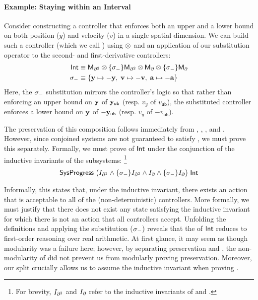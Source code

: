 \paragraph*{Example: Staying within an Interval}
Consider constructing a controller that enforces both an upper and a lower
bound on both position ($y$) and velocity ($v$) in a single spatial
dimension.  We can build such a controller (which we call \intervalShim)
using $\otimes$ and an application of our substitution operator to the
second- and first-derivative controllers:
\begin{align*}
{\ensuremath{\mathsf{Int}}} &\equiv {\ensuremath{\mathsf{M}_{\partial^2}}} \otimes \{\sigma_{-}\}{\mathsf{M}_{\partial^2}} \otimes {\ensuremath{\mathsf{M}_\partial}} \otimes \{\sigma_{-}\}{\mathsf{M}_\partial} \\
\sigma_{-} &\equiv \{ \mathbf{y} \mapsto -\mathbf{y} ,\; \mathbf{v} \mapsto -\mathbf{v} ,\; \mathbf{a} \mapsto -\mathbf{a} \}
\end{align*}
Here, the $\sigma_{-}$ substitution mirrors the controller's logic so that
rather than enforcing an upper bound on $\mathbf{y}$ of $\mathsf{\mathbf{y}_{ub}}$ (resp. $v_y$
of $v_{\mathsf{ub}}$), the substituted controller enforces a lower bound on
$\mathbf{y}$ of $-\mathsf{\mathbf{y}_{ub}}$ (resp. $v_y$ of $-v_{\mathsf{ub}}$).

The preservation of this composition follows immediately
from , , ,
and .  However, since conjoined systems are not
guaranteed to satisfy \progress{}, we must prove this separately.
Formally, we must prove \progress{} of ${\mathsf{Int}}$ under the
conjunction of the inductive invariants of the subsystems:
\footnote{For brevity, ${I_{\partial^2}}$ and ${I_{\partial}}$ refer to the inductive invariants of \derivShimx{} and \derivShimv{}.}
\[
\mathsf{SysProgress{}}\;\big({I_{\partial^2}}\wedge\{\sigma_{-}\}{I_{\partial^2}}\wedge{\ensuremath{I_{\partial}}}\wedge\{\sigma_{-}\}{I_{\partial}}\big)\;{\mathsf{Int}}
\]

Informally, this states that, under the inductive invariant, there exists
an action that is acceptable to all of the (non-deterministic) controllers.
More formally, we must justify that there does not exist any state
satisfying the inductive invariant for which there is not an action that
all controllers accept.  Unfolding the definitions and applying the
substitution ($\sigma_{-}$) reveals that the \progress{} of ${\mathsf{Int}}$
reduces to first-order reasoning over real arithmetic.  At first glance, it
may seem as though modularity was a failure here; however, by separating
preservation and \progress{}, the non-modularity of \progress{} did not
prevent us from modularly proving preservation.  Moreover, our split
crucially allows us to assume the inductive invariant when
proving \progress{}.

